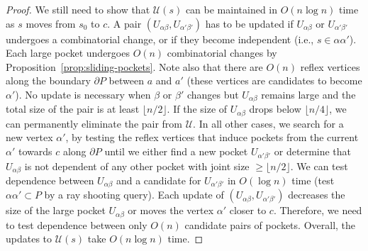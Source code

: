 \documentclass[12pt]{article}
\newcommand{\floor}[1]{{\lfloor #1 \rfloor}}
\begin{document}
\begin{proof}
We still need to show that $\mathcal{U}(s)$ can be maintained in $O(n\log n)$ time as $s$ moves from $s_0$ to $c$. A pair $(U_{\alpha\beta}, U_{\alpha'\beta'})$  has to be updated if $U_{\alpha\beta}$ or $U_{\alpha'\beta'}$ undergoes a combinatorial change, or if they become independent (i.e., $s\in \alpha\alpha'$). Each large pocket undergoes $O(n)$ combinatorial changes by Proposition~\ref{prop:sliding-pockets}. Note also that there are $O(n)$ reflex vertices along the boundary $\partial P$ between $a$ and $a'$ (these vertices are candidates to become $\alpha'$).
No update is necessary when $\beta$ or $\beta'$ changes but $U_{\alpha\beta}$ remains large and the total size of the pair is at least $\floor{n/2}$. If the size of $U_{\alpha\beta}$ drops below $\floor{n/4}$, we can permanently eliminate the pair from $\mathcal{U}$. In all other cases, we search for a new vertex $\alpha'$, by testing the reflex vertices that induce pockets from the current $\alpha'$ towards $c$ along $\partial P$ until we either find a new pocket $U_{\alpha'\beta'}$ or determine that $U_{\alpha\beta}$ is not dependent of any other pocket with joint size $\geq \floor{n/2}$. We can test dependence between $U_{\alpha\beta}$ and a candidate for $U_{\alpha'\beta'}$ in $O(\log n)$ time (test $\alpha\alpha'\subset P$ by a ray shooting query). Each update of $(U_{\alpha\beta}, U_{\alpha'\beta'})$ decreases the size of the large pocket $U_{\alpha\beta}$ or moves the vertex $\alpha'$ closer to $c$. Therefore, we need to test dependence between only $O(n)$ candidate pairs of pockets. Overall, the updates to $\mathcal{U}(s)$ take $O(n \log n)$ time.
\end{proof}
\end{document}
